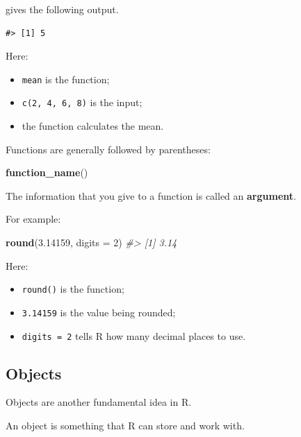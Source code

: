\documentclass[
]{book}
\newenvironment{Shaded}{\begin{snugshade}}{\end{snugshade}}
\newcommand{\AttributeTok}[1]{\textcolor[rgb]{0.13,0.29,0.53}{#1}}
\newcommand{\CommentTok}[1]{\textcolor[rgb]{0.56,0.35,0.01}{\textit{#1}}}
\newcommand{\DecValTok}[1]{\textcolor[rgb]{0.00,0.00,0.81}{#1}}
\newcommand{\FloatTok}[1]{\textcolor[rgb]{0.00,0.00,0.81}{#1}}
\newcommand{\FunctionTok}[1]{\textcolor[rgb]{0.13,0.29,0.53}{\textbf{#1}}}
\newcommand{\NormalTok}[1]{#1}
\providecommand{\tightlist}{%
  \setlength{\itemsep}{0pt}\setlength{\parskip}{0pt}}
\begin{document}
gives the following output.

\begin{verbatim}
#> [1] 5
\end{verbatim}

Here:

\begin{itemize}
\tightlist
\item
  \texttt{mean} is the function;
\item
  \texttt{c(2,\ 4,\ 6,\ 8)} is the input;
\item
  the function calculates the mean.
\end{itemize}

Functions are generally followed by parentheses:

\begin{Shaded}
\begin{Highlighting}[]
\FunctionTok{function\_name}\NormalTok{()}
\end{Highlighting}
\end{Shaded}

The information that you give to a function is called an \textbf{argument}.

For example:

\begin{Shaded}
\begin{Highlighting}[]
\FunctionTok{round}\NormalTok{(}\FloatTok{3.14159}\NormalTok{, }\AttributeTok{digits =} \DecValTok{2}\NormalTok{)}
\CommentTok{\#\textgreater{} [1] 3.14}
\end{Highlighting}
\end{Shaded}

Here:

\begin{itemize}
\tightlist
\item
  \texttt{round()} is the function;
\item
  \texttt{3.14159} is the value being rounded;
\item
  \texttt{digits\ =\ 2} tells R how many decimal places to use.
\end{itemize}

\subsection{Objects}\label{objects}

Objects are another fundamental idea in R.

An object is something that R can store and work with.
\end{document}
